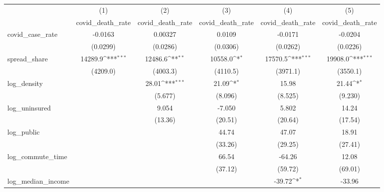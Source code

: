 {
\def\sym#1{\ifmmode^{#1}\else\(^{#1}\)\fi}
\begin{tabular}{l*{5}{c}}
\hline\hline
            &\multicolumn{1}{c}{(1)}&\multicolumn{1}{c}{(2)}&\multicolumn{1}{c}{(3)}&\multicolumn{1}{c}{(4)}&\multicolumn{1}{c}{(5)}\\
            &\multicolumn{1}{c}{covid\_death\_rate}&\multicolumn{1}{c}{covid\_death\_rate}&\multicolumn{1}{c}{covid\_death\_rate}&\multicolumn{1}{c}{covid\_death\_rate}&\multicolumn{1}{c}{covid\_death\_rate}\\
\hline
covid\_case\_rate&     -0.0163         &     0.00327         &      0.0109         &     -0.0171         &     -0.0204         \\
            &    (0.0299)         &    (0.0286)         &    (0.0306)         &    (0.0262)         &    (0.0226)         \\
[1em]
spread\_share&     14289.9\sym{***}&     12486.6\sym{**} &     10558.0\sym{*}  &     17570.5\sym{***}&     19908.0\sym{***}\\
            &    (4209.0)         &    (4003.3)         &    (4110.5)         &    (3971.1)         &    (3550.1)         \\
[1em]
log\_density &                     &       28.01\sym{***}&       21.09\sym{*}  &       15.98         &       21.44\sym{*}  \\
            &                     &     (5.677)         &     (8.096)         &     (8.525)         &     (9.230)         \\
[1em]
log\_uninsured&                     &       9.054         &      -7.050         &       5.802         &       14.24         \\
            &                     &     (13.36)         &     (20.51)         &     (20.64)         &     (17.54)         \\
[1em]
log\_public  &                     &                     &       44.74         &       47.07         &       18.91         \\
            &                     &                     &     (33.26)         &     (29.25)         &     (27.41)         \\
[1em]
log\_commute\_time&                     &                     &       66.54         &      -64.26         &       12.08         \\
            &                     &                     &     (37.12)         &     (59.72)         &     (69.01)         \\
[1em]
log\_median\_income&                     &                     &                     &      -39.72\sym{*}  &      -33.96         \\

\end{tabular}}
